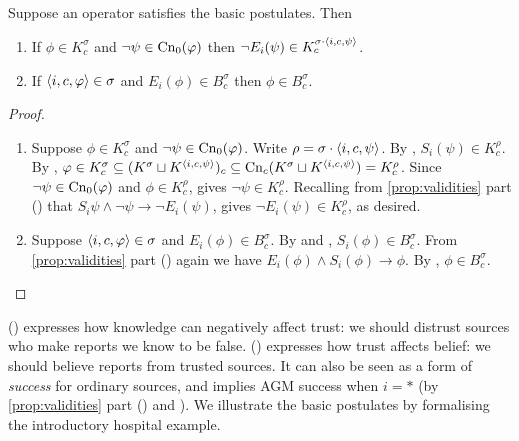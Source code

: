 \begin{proposition}
    \label{prop:basic_postulates_consequences}
    Suppose an operator satisfies the basic postulates. Then
    \begin{enumerate}
        \item \label{item:knowledge_trust_link} If $\phi \in K^\sigma_c$ and
              $\neg\psi \in \operatorname{Cn}_0(\varphi)$ then $\neg E_i(\psi) \in K^{\sigma
              \cdot \langle {i, c, \psi} \rangle}_c$.
        \item \label{item:trust_belief_link} If $\langle {i, c, \varphi} \rangle \in
              \sigma$ and $E_i(\phi) \in B^\sigma_c$ then $\phi \in
              B^\sigma_c$.
    \end{enumerate}
\end{proposition}

\begin{proof}\leavevmode
    \begin{enumerate}

        \item Suppose $\phi \in K^\sigma_c$ and $\neg\psi \in \operatorname{Cn}_0(\varphi)$.
              Write $\rho = \sigma \cdot \langle {i, c, \psi} \rangle$. By
              \soundness{}, $S_i(\psi) \in K^\rho_c$. By \kconj{}, $\varphi \in
              K^\sigma_c \subseteq (K^\sigma \sqcup K^{\langle {i, c, \psi} \rangle})_c
              \subseteq \operatorname{Cn}_c(K^\sigma \sqcup K^{\langle {i, c, \psi} \rangle}) =
              K^\rho_c$. Since $\neg\psi \in \operatorname{Cn}_0(\varphi)$ and $\phi \in
              K^\rho_c$, \closure{} gives $\neg\psi \in K^\rho_c$. Recalling
              from \cref{prop:validities} part
              () that $S_i\psi \land \neg
              \psi \rightarrow \neg E_i(\psi)$, \closure{} gives $\neg
              E_i(\psi) \in K^\rho_c$, as desired.

          \item Suppose $\langle {i, c, \varphi} \rangle \in \sigma$ and $E_i(\phi) \in
                B^\sigma_c$. By \soundness{} and \containment{}, $S_i(\phi) \in
                B^\sigma_c$. From \cref{prop:validities} part
                () again we have $E_i(\phi)
                \land S_i(\phi) \rightarrow \phi$. By \closure{}, $\phi \in
                B^\sigma_c$.

    \end{enumerate}
\end{proof}

() expresses how knowledge can negatively
affect trust: we should distrust sources who make reports we know to be false.
() expresses how trust affects belief: we
should believe reports from trusted sources.
It can also be seen as a form of \emph{success} for ordinary sources, and
implies AGM success when $i = \ast$ (by \cref{prop:validities} part
() and \closure{}). We illustrate the basic postulates
by formalising the introductory hospital example.

